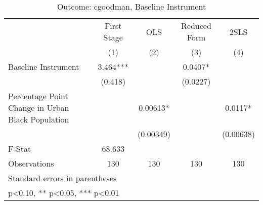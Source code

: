 \begin{table}[htbp]\centering
\def\sym#1{\ifmmode^{#1}\else\(^{#1}\)\fi}
\caption{Outcome: cgoodman, Baseline Instrument}
\begin{tabular}{l*{4}{c}}
\toprule
                    & First Stage   &         OLS   &Reduced Form   &        2SLS   \\
                    &\multicolumn{1}{c}{(1)}   &\multicolumn{1}{c}{(2)}   &\multicolumn{1}{c}{(3)}   &\multicolumn{1}{c}{(4)}   \\
\midrule
Baseline Instrument &       3.464***&               &      0.0407*  &               \\
                    &     (0.418)   &               &    (0.0227)   &               \\
\addlinespace
Percentage Point Change in Urban Black Population&               &     0.00613*  &               &      0.0117*  \\
                    &               &   (0.00349)   &               &   (0.00638)   \\
\midrule
F-Stat              &      68.633   &               &               &               \\
Observations        &         130   &         130   &         130   &         130   \\
\bottomrule
\multicolumn{5}{l}{\footnotesize Standard errors in parentheses}\\
\multicolumn{5}{l}{\footnotesize * p<0.10, ** p<0.05, *** p<0.01}\\
\end{tabular}
\end{table}
